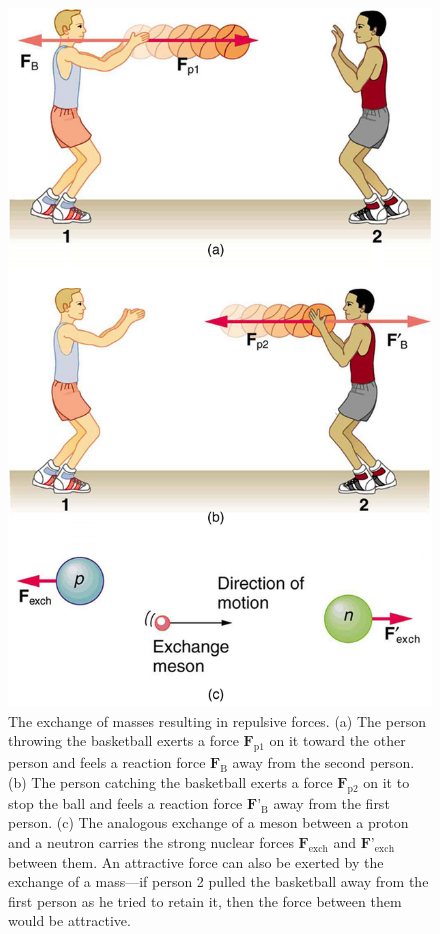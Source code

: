 \documentclass[
]{book}
\begin{document}
\begin{figure}
\hypertarget{import-auto-id2011579}{%
\centering
\includegraphics{images/Figure_04_08_02.jpg}
\caption{The exchange of masses resulting in repulsive forces. (a) The person
throwing the basketball exerts a force
\(\textbf{F}_{\text{p1}}{}\)\textsubscript{} on it toward
the other person and feels a reaction force \(\textbf{F}_{\text{B}}\) away
from the second person. (b) The person catching the basketball exerts a
force \(\textbf{F}_{\text{p2}}\) on it to stop the ball and feels a
reaction force \(\textbf{F'}_{\text{B}}{}\) away from the first person.
(c) The analogous exchange of a meson between a proton and a neutron
carries the strong nuclear forces \(\textbf{F}_{\text{exch}}\) and
\(\textbf{F'}_{\text{exch}}\) between them. An attractive force can also
be exerted by the exchange of a mass---if person 2 pulled the basketball
away from the first person as he tried to retain it, then the force
between them would be
attractive.}\label{import-auto-id2011579}
}
\end{figure}
\end{document}
